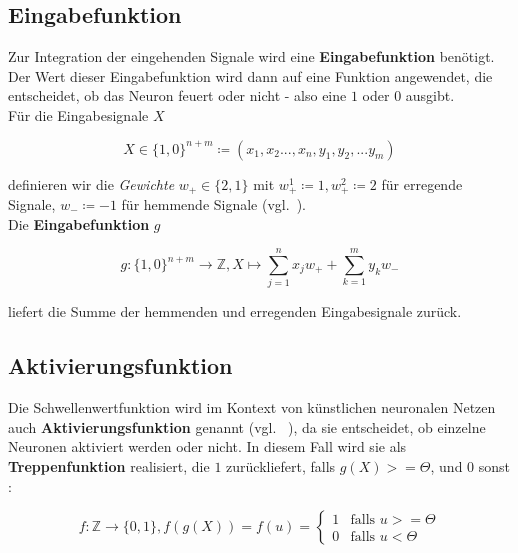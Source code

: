 \subsection*{Eingabefunktion}
Zur Integration der eingehenden Signale wird eine \textbf{Eingabefunktion} benötigt.
Der Wert dieser Eingabefunktion wird dann auf eine Funktion angewendet, die entscheidet, ob das Neuron feuert oder nicht - also eine $1$ oder $0$ ausgibt.\\

\noindent
Für die Eingabesignale $X$

\begin{equation}
X \in \{1, 0\}^{n+m} \coloneqq (x_1, x_2 ..., x_n, y_1, y_2, ... y_m)
\end{equation}\linebreak[2]

\noindent
definieren wir die \textit{Gewichte} $w_+ \in \{2, 1\}$ mit $w^1_+ \coloneqq1, w^2_+ \coloneqq 2$ für erregende Signale, $w_- \coloneqq -1$ für hemmende Signale (vgl.~\cite[27-28]{Fau94}).\\


\noindent
Die \textbf{Eingabefunktion} $g$

\begin{equation}
g: \{1, 0\}^{n+m} \to  \mathbb{Z}, X \mapsto \sum^n_{j=1} x_jw_+ + \sum^m_{k=1} y_kw_-
\label{eq:gl-mcpinpfunc}
\end{equation}\linebreak[2]

\noindent
liefert die Summe der hemmenden und erregenden Eingabesignale zurück.


\subsection*{Aktivierungsfunktion}
Die Schwellenwertfunktion wird im Kontext von künstlichen neuronalen Netzen auch \textbf{Aktivierungsfunktion} genannt (vgl. ~\cite[847]{RN09}), da sie entscheidet, ob einzelne Neuronen aktiviert werden oder nicht.
In diesem Fall wird sie als \textbf{Treppenfunktion} realisiert, die $1$ zurückliefert, falls $g(X) >= \Theta$, und $0$ sonst :

\begin{equation}
f:  \mathbb{Z} \to \{0, 1\}, f(g(X)) = f(u) = \begin{cases}
                                          1  &\text{falls } u >= \Theta \\
                                          0 &\text{falls } u < \Theta
\end{cases}
\label{eq:gl-activation}
\end{equation}\linebreak[2]

